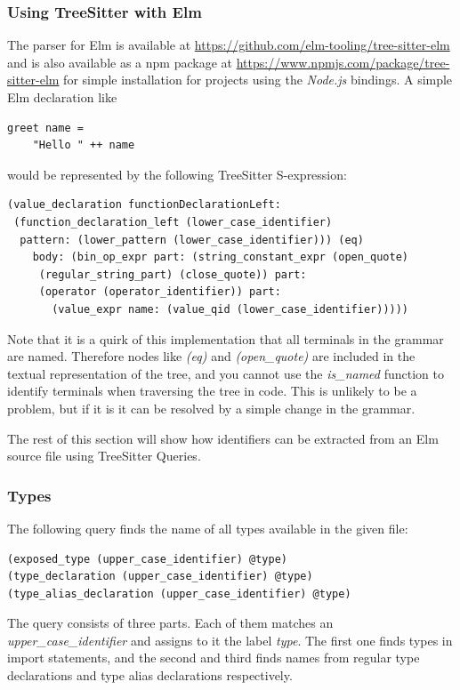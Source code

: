 \documentclass[../thesis.tex]{subfiles}
\begin{document}
\subsubsection{Using TreeSitter with Elm}
The parser for Elm is available at \url{https://github.com/elm-tooling/tree-sitter-elm}
and is also available as a npm package at \url{https://www.npmjs.com/package/tree-sitter-elm} for simple installation
for projects using the \textit{Node.js} bindings.
A simple Elm declaration like
\begin{verbatim}
greet name = 
    "Hello " ++ name
\end{verbatim}
would be represented by the following TreeSitter S-expression:
\begin{verbatim}
(value_declaration functionDeclarationLeft: 
 (function_declaration_left (lower_case_identifier) 
  pattern: (lower_pattern (lower_case_identifier))) (eq) 
    body: (bin_op_expr part: (string_constant_expr (open_quote) 
     (regular_string_part) (close_quote)) part: 
     (operator (operator_identifier)) part: 
       (value_expr name: (value_qid (lower_case_identifier)))))
\end{verbatim}
Note that it is a quirk of this implementation that all terminals in the grammar are named.
Therefore nodes like \textit{(eq)} and \textit{(open\_quote)} are included in
the textual representation of the tree, and you cannot use the \textit{is\_named} function
to identify terminals when traversing the tree in code.
This is unlikely to be a problem, but if it is it can be resolved by a simple change in the grammar.

The rest of this section will show how identifiers can be extracted from an Elm source file using TreeSitter Queries.

\subsubsection{Types}
The following query finds the name of all types available in the given file:
\begin{verbatim}
(exposed_type (upper_case_identifier) @type)
(type_declaration (upper_case_identifier) @type)
(type_alias_declaration (upper_case_identifier) @type)
\end{verbatim}
The query consists of three parts.
Each of them matches an \textit{upper\_case\_identifier} and assigns to it the label \textit{type}.
The first one finds types in import statements, and the second and third finds names from regular type declarations
and type alias declarations respectively.
\end{document}
